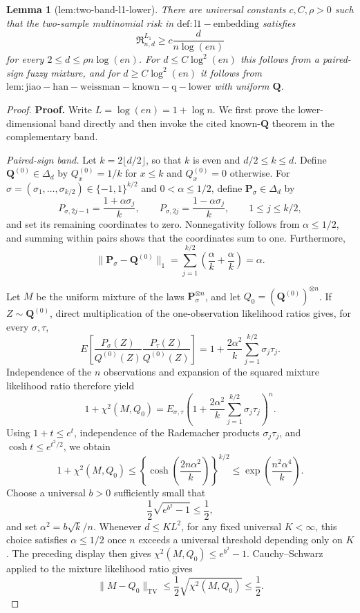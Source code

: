 \documentclass{article}
\newtheorem{lemma}{Lemma}
\begin{document}
\begin{lemma}[lem:two-band-l1-lower]\label{lem:two-band-l1-lower}
There are universal constants \(c,C,\rho>0\) such that the two-sample multinomial risk in \(\mathrm{def:l1-embedding}\) satisfies
\[
 \mathfrak R^{L_1}_{n,d}\ge c\frac{d}{n\log(en)}
\]
for every \(2\le d\le\rho n\log(en)\).  For \(d\le C\log^2(en)\) this follows from a paired-sign fuzzy mixture, and for \(d\ge C\log^2(en)\) it follows from \(\mathrm{lem:jiao-han-weissman-known-q-lower}\) with uniform \(\mathbf Q\).
\end{lemma}
\begin{proof}
\textbf{Proof.}
Write \(L=\log(en)=1+\log n\).  We first prove the lower-dimensional band directly and then invoke the cited known-\(\mathbf Q\) theorem in the complementary band.

\emph{Paired-sign band.}
Let \(k=2\lfloor d/2\rfloor\), so that \(k\) is even and \(d/2\le k\le d\).  Define \(\mathbf Q^{(0)}\in\Delta_d\) by \(Q^{(0)}_x=1/k\) for \(x\le k\) and \(Q^{(0)}_x=0\) otherwise.  For \(\sigma=(\sigma_1,\ldots,\sigma_{k/2})\in\{-1,1\}^{k/2}\) and \(0<\alpha\le1/2\), define \(\mathbf P_\sigma\in\Delta_d\) by
\[
 P_{\sigma,2j-1}=\frac{1+\alpha\sigma_j}{k},\qquad
 P_{\sigma,2j}=\frac{1-\alpha\sigma_j}{k},
 \qquad 1\le j\le k/2,
\]
and set its remaining coordinates to zero.  Nonnegativity follows from \(\alpha\le1/2\), and summing within pairs shows that the coordinates sum to one.  Furthermore,
\[
 \lVert\mathbf P_\sigma-\mathbf Q^{(0)}\rVert_1
 =\sum_{j=1}^{k/2}\left(\frac{\alpha}{k}+\frac{\alpha}{k}\right)
 =\alpha .
\]

Let \(M\) be the uniform mixture of the laws \(\mathbf P_\sigma^{\otimes n}\), and let \(Q_0=(\mathbf Q^{(0)})^{\otimes n}\).  If \(Z\sim\mathbf Q^{(0)}\), direct multiplication of the one-observation likelihood ratios gives, for every \(\sigma,\tau\),
\[
 E\left[
 \frac{P_\sigma(Z)}{Q^{(0)}(Z)}
 \frac{P_\tau(Z)}{Q^{(0)}(Z)}
 \right]
 =1+\frac{2\alpha^2}{k}\sum_{j=1}^{k/2}\sigma_j\tau_j.
\]
Independence of the \(n\) observations and expansion of the squared mixture likelihood ratio therefore yield
\[
 1+\chi^2(M,Q_0)
 =E_{\sigma,\tau}\left(
 1+\frac{2\alpha^2}{k}\sum_{j=1}^{k/2}\sigma_j\tau_j
 \right)^n.
\]
Using \(1+t\le e^t\), independence of the Rademacher products \(\sigma_j\tau_j\), and \(\cosh t\le e^{t^2/2}\), we obtain
\[
 1+\chi^2(M,Q_0)
 \le
 \left\{\cosh\left(\frac{2n\alpha^2}{k}\right)\right\}^{k/2}
 \le \exp\left(\frac{n^2\alpha^4}{k}\right).
\]
Choose a universal \(b>0\) sufficiently small that
\[
 \frac12\sqrt{e^{b^2}-1}\le\frac12,
\]
and set \(\alpha^2=b\sqrt{k}/n\).  Whenever \(d\le K L^2\), for any fixed universal \(K<\infty\), this choice satisfies \(\alpha\le1/2\) once \(n\) exceeds a universal threshold depending only on \(K\).  The preceding display then gives \(\chi^2(M,Q_0)\le e^{b^2}-1\).  Cauchy--Schwarz applied to the mixture likelihood ratio gives
\[
 \lVert M-Q_0\rVert_{\mathrm{TV}}
 \le\frac12\sqrt{\chi^2(M,Q_0)}\le\frac12.
\]


\end{proof}
\end{document}
